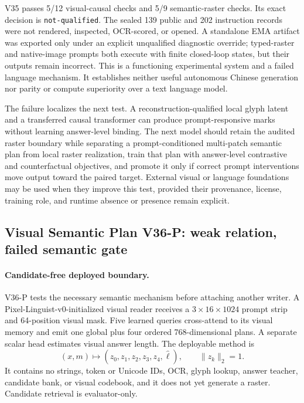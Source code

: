 \documentclass[11pt]{article}
\begin{document}
V35 passes 5/12 visual-causal checks and 5/9 semantic-raster checks. Its exact
decision is \texttt{not-qualified}. The sealed 139 public and 202 instruction
records were not rendered, inspected, OCR-scored, or opened. A standalone EMA
artifact was exported only under an explicit unqualified diagnostic override;
typed-raster and native-image prompts both execute with finite closed-loop
states, but their outputs remain incorrect. This is a functioning experimental
system and a failed language mechanism. It establishes neither useful
autonomous Chinese generation nor parity or compute superiority over a text
language model.

The failure localizes the next test. A reconstruction-qualified local glyph
latent and a transferred causal transformer can produce prompt-responsive
marks without learning answer-level binding. The next model should retain the
audited raster boundary while separating a prompt-conditioned multi-patch
semantic plan from local raster realization, train that plan with answer-level
contrastive and counterfactual objectives, and promote it only if correct
prompt interventions move output toward the paired target. External visual or
language foundations may be used when they improve this test, provided their
provenance, license, training role, and runtime absence or presence remain
explicit.

\subsection{Visual Semantic Plan V36-P: weak relation, failed semantic gate}

\paragraph{Candidate-free deployed boundary.}
V36-P tests the necessary semantic mechanism before attaching another writer.
A Pixel-Linguist-v0-initialized visual reader receives a
\(3\times16\times1024\) prompt strip and 64-position visual mask. Five
learned queries cross-attend to its visual memory and emit one global plus four
ordered 768-dimensional plans. A separate scalar head estimates visual answer
length. The deployable method is
\[
(x,m)\longmapsto(z_0,z_1,z_2,z_3,z_4,\hat\ell),
\qquad \lVert z_k\rVert_2=1.
\]
It contains no strings, token or Unicode IDs, OCR, glyph lookup, answer
teacher, candidate bank, or visual codebook, and it does not yet generate a
raster. Candidate retrieval is evaluator-only.
\end{document}

